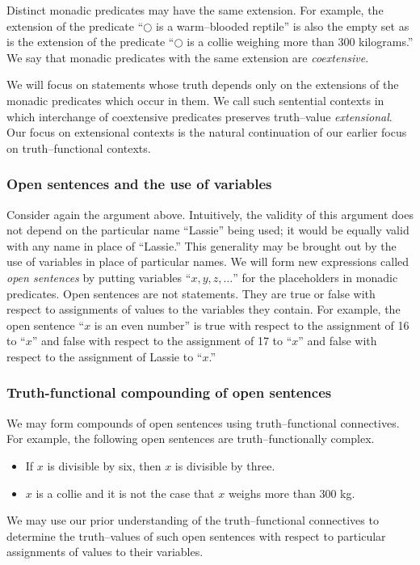 Distinct monadic predicates may have the same extension. For example, the
extension of the predicate ``$\bigcirc$ is a warm--blooded reptile'' is also
the empty set as is the extension of the predicate
``$\bigcirc$ is a collie weighing more than 300 kilograms.''
We say that monadic predicates with the same extension are {\em coextensive}.

We will focus on statements whose truth depends only on the extensions of the
monadic predicates which occur in them. We call such sentential contexts 
in which interchange of coextensive predicates preserves truth--value {\em
extensional}. Our focus on extensional contexts is the natural continuation of
our earlier focus on truth--functional contexts.
\subsubsection{Open sentences and the use of variables}

Consider again the argument above.
Intuitively, the validity of this argument does not depend on the particular
name ``Lassie'' being used; it would be equally valid with any name in place of
``Lassie.'' 
This generality may be brought out by the use of variables in place of
particular names. 
We will form new expressions called {\em open sentences} by putting variables
``$x,y,z,\dots $'' for the placeholders in monadic predicates.
Open sentences are not statements. They are true or false with respect to
assignments of values to the variables they contain. For example, the open
sentence ``$x$ is an even number'' is true with respect to the assignment of 16
to 
``$x$'' and false with respect to the assignment of 17  to ``$x$'' and false
with respect to the assignment of Lassie to ``$x$.''
\subsubsection{Truth-functional compounding of open sentences}

We may form compounds of open sentences using truth--functional connectives.
For example, the following open sentences are truth--functionally complex.
\begin{itemize}
\item If $x$ is divisible by six, then $x$ is divisible by three.
\item $x$ is a collie and it is not the case that $x$ weighs more than 300 kg. 
\end{itemize}
We may use our prior understanding of the truth--functional connectives to
determine the truth--values of such open sentences with respect to particular
assignments of values to their variables.  
